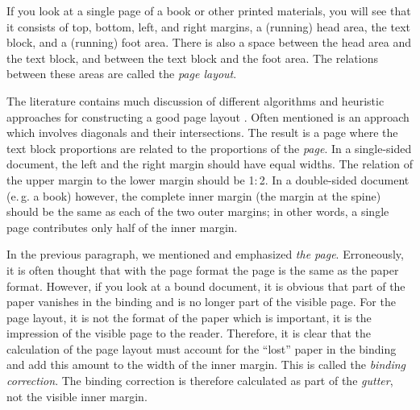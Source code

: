 \begin{Explain}
  If you look at a single page of a book or other printed materials,
  you will see that it consists of top, bottom, left, and right
  margins, a (running) head area, the text block, and a (running) foot
  area.  There is also a space between the head area and the text
  block, and between the text block and the foot area. The relations
  between these areas are called the \emph{page
    layout}.

  The literature contains much discussion of different algorithms and
  heuristic approaches for constructing a good page layout%
  .  Often mentioned is an approach which involves diagonals and their
  intersections. The result is a page where the text block proportions are
  related to the proportions of the \emph{page}.  In a single-sided document,
  the left and the right margin should have equal widths.  The relation of the
  upper margin to the lower margin should be 1\(:\)2. In a double-sided
  document (e.\,g. a book) however, the complete inner
  margin (the margin at the spine) should be the same as each of the two outer
  margins; in other words, a single page contributes only half of the inner
  margin.

  In the previous paragraph, we mentioned and emphasized \emph{the
    page}. Erroneously, it is often thought that with the page format
  the page is the same as the paper format. However, if you look at a bound document, it is obvious
  that part of the paper vanishes in the
  binding and is no longer part of the
  visible page. For the page layout, it is not the format of the paper
  which is important, it is the impression of the visible page to the
  reader. Therefore, it is clear that the calculation of the page
  layout must account for the ``lost'' paper in the binding and add
  this amount to the width of the inner margin. This is called the
  \emph{binding correction}. The
  binding correction is therefore calculated as part of the
  \emph{gutter}, not %
  the visible
  inner margin.


\end{Explain}
